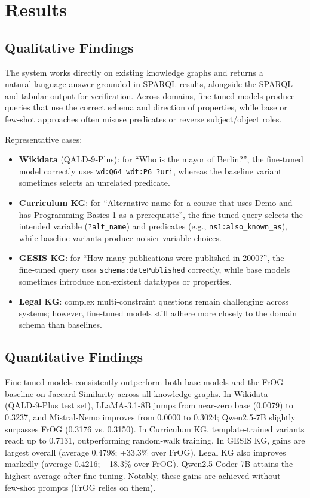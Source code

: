 \documentclass[12pt,a4paper,onecolumn]{article}
\begin{document}
\section*{Results}
\subsection*{Qualitative Findings}
The system works directly on existing knowledge graphs and returns a natural‑language answer grounded in SPARQL results, alongside the SPARQL and tabular output for verification. Across domains, fine‑tuned models produce queries that use the correct schema and direction of properties, while base or few‑shot approaches often misuse predicates or reverse subject/object roles.

Representative cases:
\begin{itemize}[leftmargin=*, itemsep=0.25\baselineskip]
  \item \textbf{Wikidata} (QALD‑9‑Plus): for “Who is the mayor of Berlin?”, the fine‑tuned model correctly uses \texttt{wd:Q64 wdt:P6 ?uri}, whereas the baseline variant sometimes selects an unrelated predicate.
  \item \textbf{Curriculum KG}: for “Alternative name for a course that uses Demo and has Programming Basics 1 as a prerequisite”, the fine‑tuned query selects the intended variable (\texttt{?alt\_name}) and predicates (e.g., \texttt{ns1:also\_known\_as}), while baseline variants produce noisier variable choices.
  \item \textbf{GESIS KG}: for “How many publications were published in 2000?”, the fine‑tuned query uses \texttt{schema:datePublished} correctly, while base models sometimes introduce non‑existent datatypes or properties.
  \item \textbf{Legal KG}: complex multi‑constraint questions remain challenging across systems; however, fine‑tuned models still adhere more closely to the domain schema than baselines.
\end{itemize}

\subsection*{Quantitative Findings}
Fine‑tuned models consistently outperform both base models and the FrOG baseline on Jaccard Similarity across all knowledge graphs. In Wikidata (QALD‑9‑Plus test set), LLaMA‑3.1‑8B jumps from near‑zero base (0.0079) to 0.3237, and Mistral‑Nemo improves from 0.0000 to 0.3024; Qwen2.5‑7B slightly surpasses FrOG (0.3176 vs. 0.3150). In Curriculum KG, template‑trained variants reach up to 0.7131, outperforming random‑walk training. In GESIS KG, gains are largest overall (average 0.4798; +33.3\% over FrOG). Legal KG also improves markedly (average 0.4216; +18.3\% over FrOG). Qwen2.5‑Coder‑7B attains the highest average after fine‑tuning. Notably, these gains are achieved without few‑shot prompts (FrOG relies on them).
\end{document}
